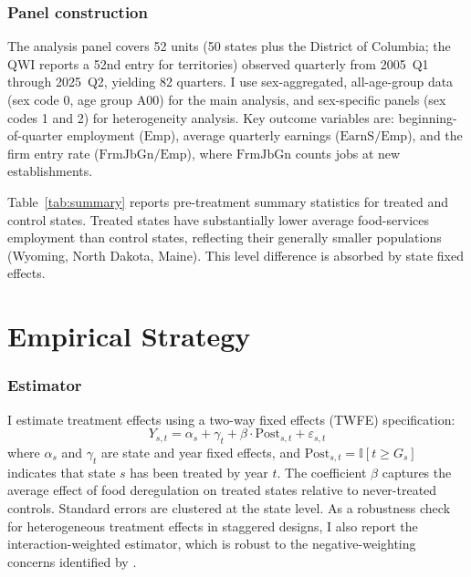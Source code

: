 \documentclass[12pt]{article}
\newcommand{\ind}{\mathbb{I}}
\begin{document}
\subsubsection*{Panel construction} The analysis panel covers 52 units (50 states plus the District of Columbia; the QWI reports a 52nd entry for territories) observed quarterly from 2005~Q1 through 2025~Q2, yielding 82 quarters. I use sex-aggregated, all-age-group data (sex code 0, age group A00) for the main analysis, and sex-specific panels (sex codes 1 and 2) for heterogeneity analysis. Key outcome variables are: beginning-of-quarter employment ($\text{Emp}$), average quarterly earnings ($\text{EarnS}/\text{Emp}$), and the firm entry rate ($\text{FrmJbGn}/\text{Emp}$), where $\text{FrmJbGn}$ counts jobs at new establishments.



Table~\ref{tab:summary} reports pre-treatment summary statistics for treated and control states. Treated states have substantially lower average food-services employment than control states, reflecting their generally smaller populations (Wyoming, North Dakota, Maine). This level difference is absorbed by state fixed effects.

\section{Empirical Strategy}
\label{sec:strategy}

\subsubsection*{Estimator} I estimate treatment effects using a two-way fixed effects (TWFE) specification:
\begin{equation}
Y_{s,t} = \alpha_s + \gamma_t + \beta \cdot \text{Post}_{s,t} + \varepsilon_{s,t}
\end{equation}
where $\alpha_s$ and $\gamma_t$ are state and year fixed effects, and $\text{Post}_{s,t} = \ind[t \geq G_s]$ indicates that state $s$ has been treated by year $t$. The coefficient $\beta$ captures the average effect of food deregulation on treated states relative to never-treated controls. Standard errors are clustered at the state level. As a robustness check for heterogeneous treatment effects in staggered designs, I also report the \citet{sun2021estimating} interaction-weighted estimator, which is robust to the negative-weighting concerns identified by \citet{goodmanbacon2021}.
\end{document}
